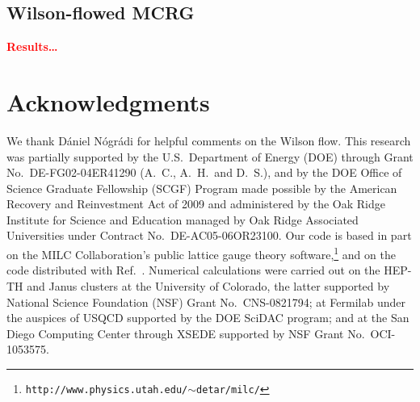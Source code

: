\documentclass{PoS}
\newcommand{\refcite}[1]{Ref.~\cite{#1}}
\newcommand{\TODO}[1]{\textcolor{red}{{\bf #1}}}
\begin{document}
\subsection{\label{sec:WMCRGresults}Wilson-flowed MCRG} %
\TODO{Results\dots}



\section*{Acknowledgments} %
We thank D\'aniel N\'ogr\'adi for helpful comments on the Wilson flow.
This research was partially supported by the U.S.~Department of Energy (DOE) through Grant No.~DE-FG02-04ER41290 (A.~C., A.~H.\ and D.~S.), and by the DOE Office of Science Graduate Fellowship (SCGF) Program made possible by the American Recovery and Reinvestment Act of 2009 and administered by the Oak Ridge Institute for Science and Education managed by Oak Ridge Associated Universities under Contract No.~DE-AC05-06OR23100.
Our code is based in part on the MILC Collaboration's public lattice gauge theory software,\footnote{\texttt{http://www.physics.utah.edu/$\sim$detar/milc/}} and on the code distributed with \refcite{Borsanyi:2012zs}.
Numerical calculations were carried out on the HEP-TH and Janus clusters at the University of Colorado, the latter supported by National Science Foundation (NSF) Grant No.~CNS-0821794; at Fermilab under the auspices of USQCD supported by the DOE SciDAC program; and at the San Diego Computing Center through XSEDE supported by NSF Grant No.~OCI-1053575.





\end{document}
